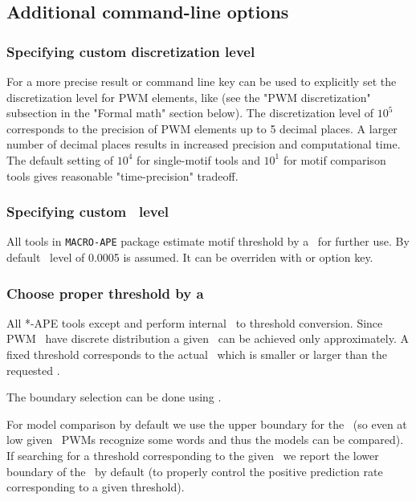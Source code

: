 \subsection{Additional command-line options}

\subsubsection{Specifying custom discretization level}
For a more precise result  or  command line key can be used to explicitly set
the discretization level for PWM elements, like  (see the "PWM discretization" subsection in the "Formal math" section below).
The discretization level of $10^5$ corresponds to the precision of PWM elements up to 5 decimal places.
A larger number of decimal places results in increased precision and computational time.
The default setting of $10^4$ for single-motif tools and $10^1$ for motif comparison tools gives reasonable "time-precision" tradeoff.

\subsubsection{Specifying custom \pvalue\ level}
All tools in \texttt{MACRO-APE} package estimate motif threshold by a \pvalue\ for further use. By default \pvalue\ level of 0.0005 is assumed.
It can be overriden with  or  option key.

\subsubsection{Choose proper threshold by a \pvalue}
All *-APE tools except  and  perform internal \pvalue\ to threshold conversion.
Since PWM \pvalues\ have discrete distribution a given \pvalue\ can be achieved only approximately.
A fixed threshold corresponds to the actual \pvalue\ which is smaller or larger than the requested \pvalue.

The boundary selection can be done using .

For model comparison by default we use the upper boundary for the \pvalue~(so even at low given \pvalues\ PWMs recognize some words and thus the models can be 
compared). If searching for a threshold corresponding to the given \pvalue\ we report the lower boundary of the \pvalue\ by default (to properly control
the positive prediction rate corresponding to a given threshold).

